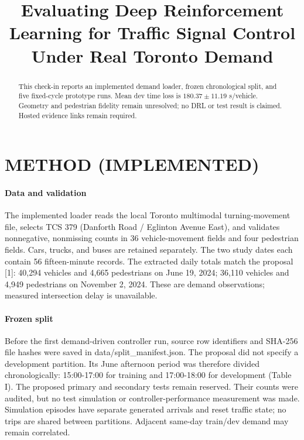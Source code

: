 \documentclass[conference]{IEEEtran}
\begin{document}
\title{Evaluating Deep Reinforcement Learning for Traffic Signal Control Under Real Toronto Demand}
\author{}
\maketitle
\begin{abstract}This check-in reports an implemented demand loader, frozen chronological split, and five fixed-cycle prototype runs. Mean dev time loss is $180.37\pm11.19$ s/vehicle. Geometry and pedestrian fidelity remain unresolved; no DRL or test result is claimed. Hosted evidence links remain required.\end{abstract}
\section{METHOD (IMPLEMENTED)}
\paragraph{Data and validation} The implemented loader reads the local Toronto multimodal turning-movement file, selects TCS 379 (Danforth Road / Eglinton Avenue East), and validates nonnegative, nonmissing counts in 36 vehicle-movement fields and four pedestrian fields. Cars, trucks, and buses are retained separately. The two study dates each contain 56 fifteen-minute records. The extracted daily totals match the proposal [1]: 40,294 vehicles and 4,665 pedestrians on June 19, 2024; 36,110 vehicles and 4,949 pedestrians on November 2, 2024. These are demand observations; measured intersection delay is unavailable.

\paragraph{Frozen split} Before the first demand-driven controller run, source row identifiers and SHA-256 file hashes were saved in data/split\_manifest.json. The proposal did not specify a development partition. Its June afternoon period was therefore divided chronologically: 15:00-17:00 for training and 17:00-18:00 for development (Table I). The proposed primary and secondary tests remain reserved. Their counts were audited, but no test simulation or controller-performance measurement was made. Simulation episodes have separate generated arrivals and reset traffic state; no trips are shared between partitions. Adjacent same-day train/dev demand may remain correlated.
\end{document}
